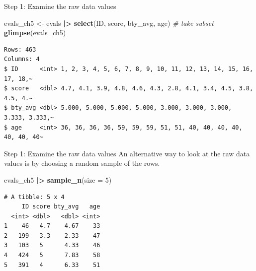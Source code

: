 \documentclass[
  ignorenonframetext,
]{beamer}
\newenvironment{Shaded}{\begin{snugshade}}{\end{snugshade}}
\newcommand{\AttributeTok}[1]{\textcolor[rgb]{0.13,0.29,0.53}{#1}}
\newcommand{\CommentTok}[1]{\textcolor[rgb]{0.56,0.35,0.01}{\textit{#1}}}
\newcommand{\DecValTok}[1]{\textcolor[rgb]{0.00,0.00,0.81}{#1}}
\newcommand{\FunctionTok}[1]{\textcolor[rgb]{0.13,0.29,0.53}{\textbf{#1}}}
\newcommand{\NormalTok}[1]{#1}
\newcommand{\OtherTok}[1]{\textcolor[rgb]{0.56,0.35,0.01}{#1}}
\newcommand{\SpecialCharTok}[1]{\textcolor[rgb]{0.81,0.36,0.00}{\textbf{#1}}}
\begin{document}
\begin{frame}[fragile]{Step 1: Examine the raw data values}
\protect{}\label{step-1-examine-the-raw-data-values}
\normalsize

\begin{Shaded}
\begin{Highlighting}[]
\NormalTok{evals\_ch5 }\OtherTok{\textless{}{-}}\NormalTok{ evals }\SpecialCharTok{|\textgreater{}}
  \FunctionTok{select}\NormalTok{(ID, score, bty\_avg, age)   }\CommentTok{\# take subset}
\FunctionTok{glimpse}\NormalTok{(evals\_ch5)}
\end{Highlighting}
\end{Shaded}

\begin{verbatim}
Rows: 463
Columns: 4
$ ID      <int> 1, 2, 3, 4, 5, 6, 7, 8, 9, 10, 11, 12, 13, 14, 15, 16, 17, 18,~
$ score   <dbl> 4.7, 4.1, 3.9, 4.8, 4.6, 4.3, 2.8, 4.1, 3.4, 4.5, 3.8, 4.5, 4.~
$ bty_avg <dbl> 5.000, 5.000, 5.000, 5.000, 3.000, 3.000, 3.000, 3.333, 3.333,~
$ age     <int> 36, 36, 36, 36, 59, 59, 59, 51, 51, 40, 40, 40, 40, 40, 40, 40~
\end{verbatim}

\normalsize
\end{frame}

\begin{frame}[fragile]{Step 1: Examine the raw data values}
\protect{}\label{step-1-examine-the-raw-data-values-1}
An alternative way to look at the raw data values is by choosing a
random sample of the rows.

\normalsize

\begin{Shaded}
\begin{Highlighting}[]
\NormalTok{evals\_ch5 }\SpecialCharTok{|\textgreater{}}
  \FunctionTok{sample\_n}\NormalTok{(}\AttributeTok{size =} \DecValTok{5}\NormalTok{)}
\end{Highlighting}
\end{Shaded}

\begin{verbatim}
# A tibble: 5 x 4
     ID score bty_avg   age
  <int> <dbl>   <dbl> <int>
1    46   4.7    4.67    33
2   199   3.3    2.33    47
3   103   5      4.33    46
4   424   5      7.83    58
5   391   4      6.33    51
\end{verbatim}

\normalsize
\end{frame}
\end{document}
